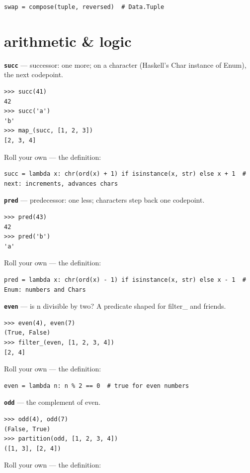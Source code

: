 \documentclass[10pt,letterpaper]{article}
\begin{document}
\begin{lstlisting}[style=ex]
swap = compose(tuple, reversed)  # Data.Tuple
\end{lstlisting}

\section{arithmetic \& logic}
\textbf{\texttt{succ}} --- successor: one more; on a character (Haskell's Char instance of Enum), the next codepoint.
\begin{lstlisting}[style=ex]
>>> succ(41)
42
>>> succ('a')
'b'
>>> map_(succ, [1, 2, 3])
[2, 3, 4]
\end{lstlisting}

Roll your own --- the definition:

\begin{lstlisting}[style=ex]
succ = lambda x: chr(ord(x) + 1) if isinstance(x, str) else x + 1  # next: increments, advances chars
\end{lstlisting}
\textbf{\texttt{pred}} --- predecessor: one less; characters step back one codepoint.
\begin{lstlisting}[style=ex]
>>> pred(43)
42
>>> pred('b')
'a'
\end{lstlisting}

Roll your own --- the definition:

\begin{lstlisting}[style=ex]
pred = lambda x: chr(ord(x) - 1) if isinstance(x, str) else x - 1  # Enum: numbers and Chars
\end{lstlisting}
\textbf{\texttt{even}} --- is n divisible by two? A predicate shaped for filter\_ and friends.
\begin{lstlisting}[style=ex]
>>> even(4), even(7)
(True, False)
>>> filter_(even, [1, 2, 3, 4])
[2, 4]
\end{lstlisting}

Roll your own --- the definition:

\begin{lstlisting}[style=ex]
even = lambda n: n % 2 == 0  # true for even numbers
\end{lstlisting}
\textbf{\texttt{odd}} --- the complement of even.
\begin{lstlisting}[style=ex]
>>> odd(4), odd(7)
(False, True)
>>> partition(odd, [1, 2, 3, 4])
([1, 3], [2, 4])
\end{lstlisting}

Roll your own --- the definition:
\end{document}
